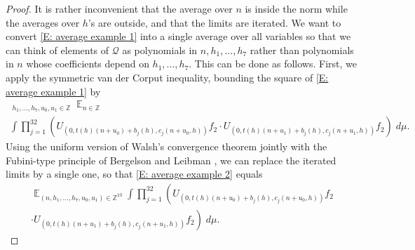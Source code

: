 \documentclass[11pt]{amsart}
\theoremstyle{definition}
\DeclareMathOperator*{\oE}{\overline{\mathbb{E}}}
\DeclareMathOperator*{\E}{\mathbb{E}}
\newcommand{\Z}{{\mathbb Z}}
\newcommand{\CQ}{{\mathcal Q}}
\newcommand{\1}{{\mathbf{1}}}
\begin{document}
\begin{proof}
    It is rather inconvenient that the average over $n$ is inside the norm while the averages over $h$'s are outside, and that the limits are iterated. We want to convert \eqref{E: average example 1} into a single average over all variables so that we can think of elements of $\CQ$ as polynomials in $n, h_1, \ldots, h_7$ rather than polynomials in $n$ whose coefficients depend on $h_1, \ldots, h_7$.
    This can be done as follows. First, we apply the symmetric van der Corput inequality, %
     bounding the square of \eqref{E: average example 1} by
    \begin{multline}\label{E: average example 2}
        \oE_{h_1,\ldots, h_7,u_0,u_1\in\Z}\E_{n\in\Z}\\
        \int\prod_{j=1}^{32} \left(U_{(0, t(h)(n+u_0) + b_j(h),c_j(n+u_0,h))} f_2\cdot 
        U_{(0, t(h)(n+u_1) + b_j(h),c_j(n+u_1,h))}  f_2\right)\; d\mu.
    \end{multline}
    Using the uniform version of Walsh's convergence theorem \cite{W12} jointly with the Fubini-type principle of Bergelson and Leibman \cite[Lemma~1.1]{BL15}, we can replace the iterated limits by a single one, so that \eqref{E: average example 2} equals
    \begin{multline}\label{E: average example 3}
        \E_{(n,h_1, \ldots, h_7,u_0,u_1)\in\Z^{10}}\int\prod_{j=1}^{32} \left(U_{(0, t(h)(n+u_0) + b_j(h),c_j(n+u_0,h))} f_2\right.\\ 
        \left. \cdot U_{(0, t(h)(n+u_1) + b_j(h),c_j(n+u_1,h))}  f_2\right)\; d\mu.
    \end{multline}
    

\end{proof}
\end{document}
